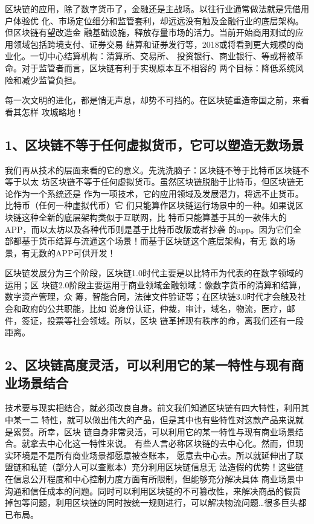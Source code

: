 \documentclass[11pt]{ctexart}
\begin{document}
区块链的应用，除了数字货币了，金融还是主战场。以往行业通常做法就是凭借用户体验优
化、市场定位细分和监管套利，却远远没有触及金融行业的底层架构。但区块链有望改造金
融基础设施，释放存量市场的活力。当前开始商用测试的应用领域包括跨境支付、证券交易
结算和证券发行等，2018或将看到更大规模的商业化。一切中心结算机构：清算所、交易所、
投资银行、商业银行、等或将被革命。对于监管者而言，区块链有利于实现原本互不相容的
两个目标：降低系统风险和减少监管负担。

每一次文明的进化，都是悄无声息，却势不可挡的。在区块链重造帝国之前，来看看其怎样
攻城略地！

\subsection{1、区块链不等于任何虚拟货币，它可以塑造无数场景}
\label{sec:org009f7fe}

我们再从技术的层面来看的它的意义。先洗洗脑子：区块链不等于比特币区块链不等于以太
坊区块链不等于任何虚拟货币。虽然区块链脱胎于比特币，但区块链无论作为一个系统还是
作为一项技术，它的应用领域及发展潜力，将远不止货币。比特币（任何一种虚拟代币）它
们只能算作区块链运行场景中的一种。如果说区块链这种全新的底层架构类似于互联网，比
特币只能算基于其的一款伟大的APP，而以太坊以及各种代币则是基于比特币改版或者抄袭
的app。因为它们全部都基于货币结算与流通这个场景！而基于区块链这个底层架构，有无
数的场景，有无数的APP可供开发！



区块链发展分为三个阶段，区块链1.0时代主要是以比特币为代表的在数字领域的运用；区
块链2.0阶段主要运用于商业领域金融领域：像数字货币的清算和结算，数字资产管理，众
筹，智能合同，法律文件验证等；在区块链3.0时代才会触及社会和政府的公共职能，比如
说身份认证，仲裁，审计，域名，物流，医疗，邮件，签证，投票等社会领域。所以，区块
链革掉现有秩序的命，离我们还有一段距离。

\subsection{2、区块链高度灵活，可以利用它的某一特性与现有商业场景结合}
\label{sec:orge8df7d3}

技术要与现实相结合，就必须改良自身。前文我们知道区块链有四大特性，利用其中某一二
特性，就可以做出伟大的产品，但是其中也有些特性对这款产品来说就是累赘。所幸，区块
链自身非常灵活，可以利用它的某一特性与现有商业场景结合。就拿去中心化这一特性来说。
有些人言必称区块链的去中心化。然而，但现实环境是不是所有商业场景都愿意被查账本，
愿意去中心去。所以就延伸出了联盟链和私链（部分人可以查账本）充分利用区块链信息无
法造假的优势！这些链在信息公开程度和中心控制力度方面有所限制，但能够充分解决具体
商业场景中沟通和信任成本的问题。同时可以利用区块链的不可篡改性，来解决商品的假货
掉包等问题，利用区块链的同时按统一规则进行，可以解决物流问题\ldots{}很多巨头都已布局。
\end{document}
